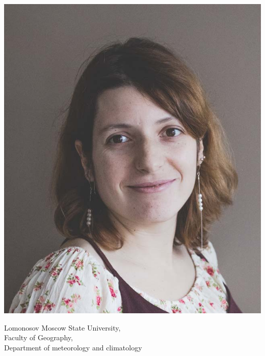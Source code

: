 \documentclass[11pt]{developercv} %
\begin{document}
\begin{minipage}[t]{0.35\textwidth} %
  \vspace{-\baselineskip} %
  \includegraphics[scale=0.13]{Photo.png}
\end{minipage}

\vspace{0.5cm}



{\large{Lomonosov Moscow State University,\\
Faculty of Geography,\\
Department of meteorology and climatology}}
\\\\
\end{document}
